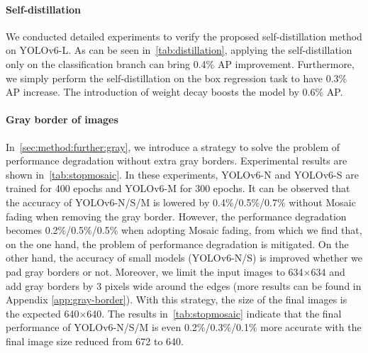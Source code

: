 \documentclass[10pt,twocolumn,letterpaper]{article}
\begin{document}
\begin{table}[ht]
\centering
{}
\caption{Ablation study on the self-distillation.}
\label{tab:distillation}
\end{table}
\paragraph{Self-distillation}
We conducted detailed experiments to verify the proposed self-distillation method on YOLOv6-L. As can be seen in~\cref{tab:distillation}, applying the self-distillation only on the classification branch can bring 0.4\% AP improvement. Furthermore, we simply perform the self-distillation on the box regression task to have 0.3\% AP increase. The introduction of weight decay boosts the model by 0.6\% AP.

\paragraph{Gray border of images}
  In~\cref{sec:method:further:gray}, we introduce a strategy to solve the problem of performance degradation without extra gray borders. Experimental results are shown in~\cref{tab:stopmosaic}. In these experiments, YOLOv6-N and YOLOv6-S are trained for 400 epochs and YOLOv6-M for 300 epochs. It can be observed that the accuracy of YOLOv6-N/S/M is lowered by 0.4\%/0.5\%/0.7\% without Mosaic fading when removing the gray border. However, the performance degradation becomes 0.2\%/0.5\%/0.5\% when adopting Mosaic fading, from which we find that, on the one hand, the problem of performance degradation is mitigated. On the other hand, the accuracy of small models (YOLOv6-N/S) is improved whether we pad gray borders or not. Moreover, we limit the input images to 634$\times$634 and add gray borders by 3 pixels wide around the edges (more results can be found in Appendix \ref{app:gray-border}). With this strategy, the size of the final images is the expected 640$\times$640. The results in~\cref{tab:stopmosaic} indicate that the final performance of YOLOv6-N/S/M is even 0.2\%/0.3\%/0.1\% more accurate with the final image size reduced from 672 to 640.
  
\end{document}
